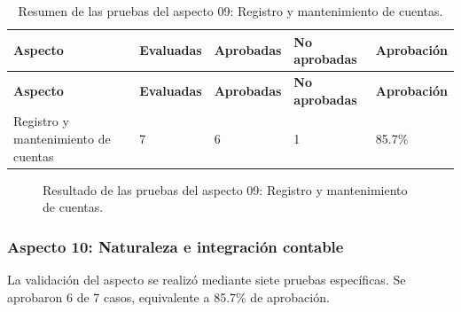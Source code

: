 \endgroup
\begingroup\fontsize{8}{9}\selectfont\setlength{\tabcolsep}{4pt}
\begin{xltabular}{\linewidth}{@{}p{4.0cm}p{2.0cm}p{2.0cm}p{2.2cm}p{2.2cm}@{}}

\caption{Resumen de las pruebas del aspecto 09: Registro y mantenimiento de cuentas.}\label{tab:cap4_resumen_aspecto_09}\\
\toprule
\textbf{Aspecto} & \textbf{Evaluadas} & \textbf{Aprobadas} & \textbf{No aprobadas} & \textbf{Aprobación}\\
\midrule
\endfirsthead
\toprule
\textbf{Aspecto} & \textbf{Evaluadas} & \textbf{Aprobadas} & \textbf{No aprobadas} & \textbf{Aprobación}\\
\midrule
\endhead
\endfoot
\bottomrule
\endlastfoot

Registro y mantenimiento de cuentas & 7 & 6 & 1 & 85.7\%\\
\bottomrule
\end{xltabular}
\endgroup


\begin{figure}[H]
\centering
\caption{Resultado de las pruebas del aspecto 09: Registro y mantenimiento de cuentas.}\label{fig:cap4_aspecto_nom_09}
\end{figure}

\subsubsection{Aspecto 10: Naturaleza e integración contable}
La validación del aspecto se realizó mediante siete pruebas específicas. Se aprobaron 6 de 7 casos, equivalente a 85.7\% de aprobación.

